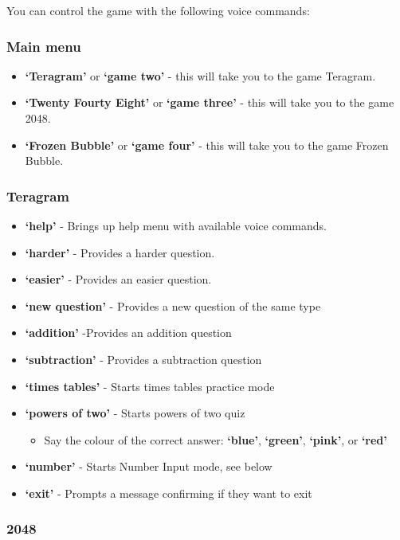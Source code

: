 \documentclass[11pt, oneside]{article}
\begin{document}
You can control the game with the following voice commands:

\subsubsection{Main menu}

\begin{itemize}
  \item {\bf`Teragram'} or {\bf`game two'}  - this will take you to the game Teragram.
  \item {\bf`Twenty Fourty Eight'} or {\bf`game three'} - this will take you to the game 2048.
  \item {\bf`Frozen Bubble'} or {\bf`game four'} - this will take you to the game Frozen Bubble.
\end{itemize}

\subsubsection{Teragram}

\begin{itemize}
  \item {\bf`help'} - Brings up help menu with available voice commands. 
  \item {\bf`harder'} - Provides a harder question. 
  \item {\bf`easier'} - Provides an easier question.
  \item {\bf`new question'} - Provides a new question of the same type
  \item {\bf`addition'} -Provides an addition question
  \item {\bf`subtraction'} - Provides a subtraction question
  \item {\bf`times tables'} - Starts times tables practice mode
  \item {\bf`powers of two'} - Starts powers of two quiz
  \begin{itemize}
  	\item Say the colour of the correct answer: {\bf`blue'}, {\bf`green'}, {\bf`pink'}, or {\bf`red'}
  \end{itemize}
  \item {\bf`number'} - Starts Number Input mode, see below
  \item {\bf`exit'} - Prompts a message confirming if they want to exit
 
\end{itemize}

\subsubsection{2048}
\end{document}
